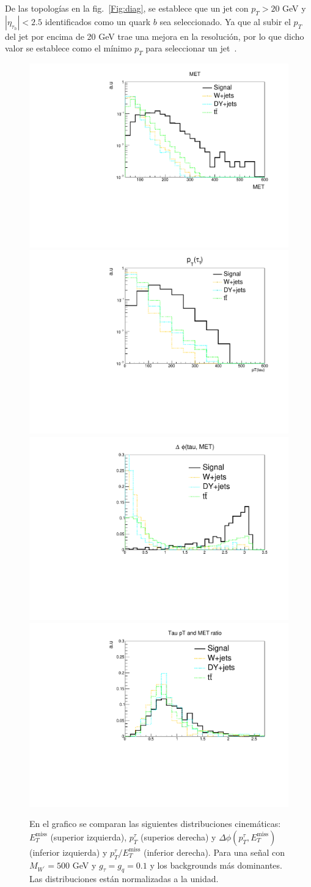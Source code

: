 De las topologías en la fig.~\ref{Fig:diag}, se establece que un jet con $p_T > 20$ GeV y $|\eta_{\tau_h}| < 2.5$ identificados como un quark $b$ sea seleccionado. Ya que al subir el $p_T$ del jet por encima de 20 GeV trae una mejora en la resolución,  por lo que dicho valor se establece como el mínimo $p_T$ para seleccionar un jet~\cite{ATL-PHYS-PUB-2015-023}. 
%
\begin{figure}
\begin{center}
\includegraphics[width = 0.45 \textwidth]{figures/Wp_MET}
\includegraphics[width = 0.45 \textwidth]{figures/Wp_Tau_pT}
\includegraphics[width = 0.45 \textwidth]{figures/Wp_Delta_phi}
\includegraphics[width = 0.45 \textwidth]{figures/Wp_TauPt_MET_ratio}
\caption{En el grafico se comparan las siguientes distribuciones cinemáticas: $E^{\text{miss}}_{T}$ (superior izquierda), $p^{\tau}_{T}$ (superios derecha) y $\Delta \phi (p^{\tau}_{T}, E^{\text{miss}}_{T})$ (inferior izquierda) y $p^{\tau}_{T}/E^{\text{miss}}_{T}$ (inferior derecha). Para una señal con $M_{W^{\prime}}=500$ GeV y $g_{\tau}=g_{q} = 0.1$ y los backgrounds más dominantes. Las distribuciones están normalizadas a la unidad.}
\label{Fig:DisCine}
\end{center}
\end{figure}
%

